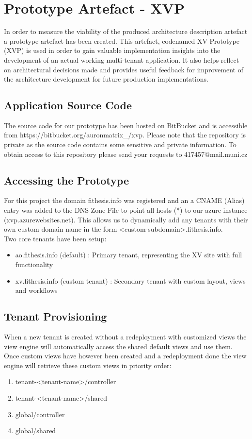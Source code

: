 \chapter{Prototype Artefact - XVP}

In order to measure the viability of the produced architecture description artefact a prototype artefact has been created. This artefact, codenamed XV Prototype (XVP) is used in order to gain valuable implementation insights into the development of an actual working multi-tenant application. It also helps reflect on architectural decisions made and provides useful feedback for improvement of the architecture development for future production implementations.

\section{Application Source Code}

The source code for our prototype has been hosted on BitBucket and is accessible from https://bitbucket.org/auronmatrix_/xvp. Please note that the repository is private as the source code contains some sensitive and private information. To obtain access to this repository please send your requests to 417457@mail.muni.cz

\section{Accessing the Prototype}
For this project the domain fithesis.info was registered and an a CNAME (Alias) entry was added to the DNS Zone File to point all hosts (*) to our azure instance (xvp.azurewebsites.net). This allows us to dynamically add any tenants with their own custom domain name in the form
<custom-subdomain>.fithesis.info. 
\\
Two core tenants have been setup:
\begin{itemize}
\item ao.fithesis.info (default) : Primary tenant, representing the XV site with full functionality
\item xv.fithesis.info (custom tenant) : Secondary tenant with custom layout, views and workflows
\end{itemize}

\section{Tenant Provisioning}
When a new tenant is created without a redeployment with customized views the view engine will automatically access the shared default views and use them. Once custom views have however been created and a redeployment done the view engine will retrieve these custom views in priority order:
\begin{enumerate}
\item tenant-<tenant-name>/controller
\item tenant-<tenant-name>/shared
\item global/controller
\item global/shared
\end{enumerate}

